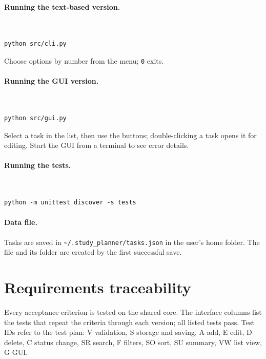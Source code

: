 \documentclass[11pt,a4paper]{article}
\newcommand{\code}[1]{\texttt{#1}}
\begin{document}
\paragraph{Running the text-based version.}\mbox{}\\
\begin{lstlisting}[numbers=none]
python src/cli.py
\end{lstlisting}
Choose options by number from the menu; \code{0} exits.

\paragraph{Running the GUI version.}\mbox{}\\
\begin{lstlisting}[numbers=none]
python src/gui.py
\end{lstlisting}
Select a task in the list, then use the buttons; double-clicking a task opens
it for editing. Start the GUI from a terminal to see error details.

\paragraph{Running the tests.}\mbox{}\\
\begin{lstlisting}[numbers=none]
python -m unittest discover -s tests
\end{lstlisting}

\paragraph{Data file.} Tasks are saved in
\code{\textasciitilde/.study\_planner/tasks.json} in the user's home folder. The
file and its folder are created by the first successful save.

\clearpage
\section{Requirements traceability}
\label{app:trace}

Every acceptance criterion is tested on the shared core. The interface
columns list the tests that repeat the criteria through each version; all
listed tests pass. Test IDs refer to the test plan: V validation, S storage
and saving, A add, E edit, D delete, C status change, SR search, F filters,
SO sort, SU summary, VW list view, G GUI.
\end{document}
